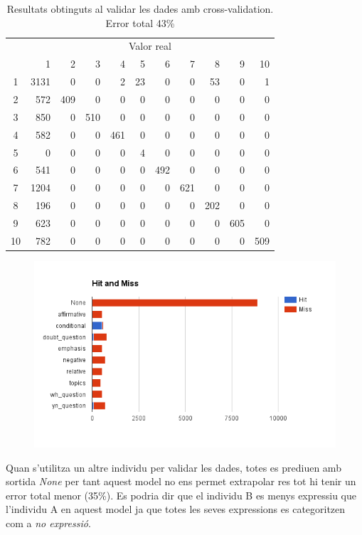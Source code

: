 \documentclass[a4paper]{article}
\begin{document}
\begin{table}[H]
	\centering
	\begin{tabular}{c|rrrrrrrrrr}
		& \multicolumn{10}{c}{Valor real} \\
		& 1 & 2 & 3 & 4 & 5 & 6 & 7 & 8 & 9 & 10 \\
		\hline
		1 & 3131 & 0 & 0 & 2 & 23 & 0 & 0 & 53 & 0 & 1 \\
		2 & 572 & 409 & 0 & 0 & 0 & 0 & 0 & 0 & 0 & 0 \\
		3 & 850 & 0 & 510 & 0 & 0 & 0 & 0 & 0 & 0 & 0 \\
		4 & 582 & 0 & 0 & 461 & 0 & 0 & 0 & 0 & 0 & 0 \\
		5 & 0 & 0 & 0 & 0 & 4 & 0 & 0 & 0 & 0 & 0 \\
		6 & 541 & 0 & 0 & 0 & 0 & 492 & 0 & 0 & 0 & 0 \\
		7 & 1204 & 0 & 0 & 0 & 0 & 0 & 621 & 0 & 0 & 0 \\
		8 & 196 & 0 & 0 & 0 & 0 & 0 & 0 & 202 & 0 & 0 \\
		9 & 623 & 0 & 0 & 0 & 0 & 0 & 0 & 0 & 605 & 0 \\
		10 & 782 & 0 & 0 & 0 & 0 & 0 & 0 & 0 & 0 & 509 \\
	\end{tabular}
	\caption{Resultats obtinguts al validar les dades amb cross-validation. Error total 43\%}
\end{table}

\begin{figure}[H]
	\centering
	\includegraphics[width=\textwidth]{images/image02}
\end{figure}

Quan s'utilitza un altre individu per validar les dades, totes es prediuen amb sortida \emph{None} per tant aquest model no ens permet extrapolar res tot hi tenir un error total menor (35\%). Es podria dir que el individu B es menys expressiu que l’individu A  en aquest model ja que totes les seves expressions es categoritzen com a \emph{no expressió}.
\end{document}
